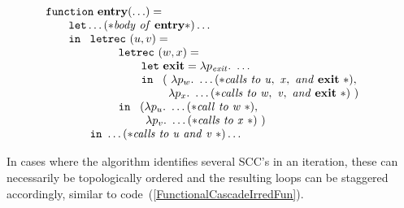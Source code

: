 \begin{description}
  \begin{equation}
    \label{FunctionalSteensgaard}
     \begin{array}{l}
       \mathtt{function}\ \entrynode (\ldots)=\\ 
       \qquad \mathtt{let} \ldots (* \mathit{body\ of\ \entrynode}*)\ldots\\
       \qquad \mathtt{in}\ 
         \begin{array}[t]{l}
           \mathtt{letrec}\ (u,v) =\\
           \qquad \begin{array}[t]{l}
                     \mathtt{letrec}\ (w,x) =\\
                     \qquad \mathtt{let}\ \exitnode = \lambda p_{\mathit{exit}}.\ \ldots\\
                     \qquad \mathtt{in}\ 
                       \begin{array}[t]{l}
                          (%
                           \ \lambda p_w.\ \ldots (*\mathit{calls\ to\ u,\
                                            x,\ and\ \exitnode}\ *),\\ 
                           \ \, \lambda p_x.\ \ldots (*\mathit{calls\ to\ w,\  
                                            v,\ and\ \exitnode}\ *)\ )
                       \end{array}\\
                     \mathtt{in}\ 
                     \begin{array}[t]{l}
                       (%
                         \lambda p_u.\ \ldots (*\mathit{call\ to\ w}\ *),\\ 
                        \ \, \lambda p_v.\ \ldots (*\mathit{calls\ to\ x}\ *)\ )
                      \end{array}\\
                    \end{array}\\
                    \mathtt{in}\ \ldots (*\mathit{calls\ to\ u\ and\ v}\ *) \ldots
         \end{array}
       \end{array}
  \end{equation} 

  In cases where the algorithm identifies several SCC's in an
  iteration, these can necessarily be topologically ordered and the
  resulting loops can be staggered accordingly, similar to
  code~(\ref{FunctionalCascadeIrredFun}).


\end{description}
